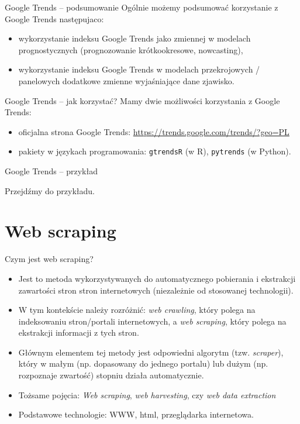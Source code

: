 \documentclass[10pt,ignorenonframetext, aspectratio=169]{beamer}
\begin{document}
\begin{frame}{Google Trends -- podsumowanie}
Ogólnie możemy podsumować korzystanie z Google Trends następujaco:

\begin{itemize}
    \item wykorzystanie indeksu Google Trends jako zmiennej w modelach prognostycznych (prognozowanie krótkookresowe, nowcasting),
    \item wykorzystanie indeksu Google Trends w modelach przekrojowych / panelowych dodatkowe zmienne wyjaśniające dane zjawisko.
\end{itemize}

\end{frame}


\begin{frame}{Google Trends -- jak korzystać?}
Mamy dwie możliwości korzystania z Google Trends:
\begin{itemize}
\item oficjalna strona Google Trends: \url{https://trends.google.com/trends/?geo=PL}
\item pakiety w językach programowania: \texttt{gtrendsR} (w R), \texttt{pytrends} (w Python).
\end{itemize}

\end{frame}

\begin{frame}{Google Trends -- przykład}
    \begin{center}
        Przejdźmy do przykładu.
    \end{center}
\end{frame}




\section{Web scraping}

\begin{frame}{Czym jest web scraping?}
\begin{itemize}
    \item Jest to metoda wykorzystywanych do automatycznego pobierania i ekstrakcji zawartości stron stron internetowych (niezależnie od stosowanej technologii).
    \item W tym kontekście należy rozróżnić: \textit{web crawling}, który polega na indeksowaniu stron/portali internetowych, a \textit{web scraping}, który polega na ekstrakcji informacji z tych stron.
    \item Głównym elementem tej metody jest odpowiedni algorytm (tzw. \textit{scraper}), który w małym (np. dopasowany do jednego portalu) lub dużym (np. rozpoznaje zwartość) stopniu działa automatycznie.
    \item Tożsame pojęcia: \textit{Web scraping}, \textit{web harvesting}, czy \textit{web data extraction}
    \item Podstawowe technologie: WWW, html, przeglądarka internetowa.
\end{itemize}
\end{frame}
\end{document}
